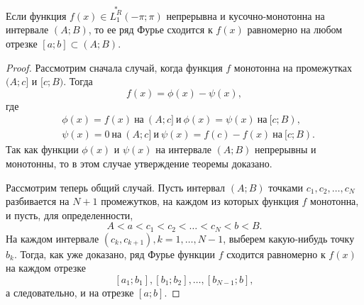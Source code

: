 \begin{thm}  \label{ch18thm4}
Если функция $f(x) \in \overset{*}{L^{R}_1}(-\pi;\pi)$ непрерывна и кусочно-монотонна на интервале $(A;B)$, то ее ряд Фурье сходится к $f(x)$ равномерно на любом отрезке $[a;b] \subset (A;B)$.
\end{thm}
\begin{proof}
Рассмотрим сначала случай, когда функция $f$ монотонна на промежутках $(A;c]$ и $[c;B)$. Тогда
$$
f(x) = \phi(x) - \psi(x),
$$
где
\begin{align*}
&\phi(x) = f(x)\ \text{на}\ (A;c]\ \text{и}\ \phi(x) = \psi(x)\ \text{на}\ [c;B),\\
&\psi(x) = 0   \ \text{на}\ (A;c]\ \text{и}\ \psi(x) = f(c) - f(x) \ \text{на}\ [c;B).
\end{align*}
Так как функции $\phi(x)$ и $\psi(x)$ на интервале $(A;B)$ непрерывны и монотонны, то в этом случае утверждение теоремы доказано.

Рассмотрим теперь общий случай. Пусть интервал $(A;B)$ точками $c_1, c_2, \ldots, c_N$ разбивается на $N + 1$ промежутков, на каждом из которых функция $f$ монотонна, и пусть, для определенности,
$$
A < a < c_1 < c_2 < \ldots < c_N < b < B.
$$
На каждом интервале $(c_k, c_{k+1}), k = 1, \ldots, N - 1$, выберем какую-нибудь точку $b_k$. Тогда, как уже доказано, ряд Фурье функции $f$ сходится равномерно к $f(x)$ на каждом отрезке
$$
[a_1; b_1], [b_1; b_2],\ldots, [b_{N-1};b],
$$
а следовательно, и на отрезке $[a;b]$.
\end{proof}